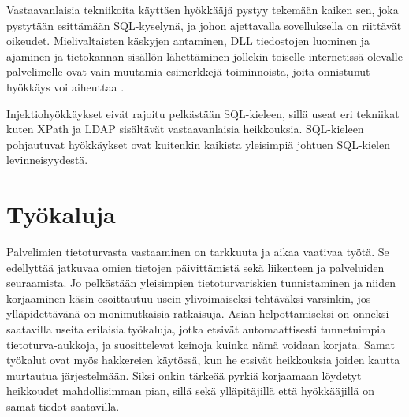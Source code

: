 Vastaavanlaisia tekniikoita käyttäen hyökkääjä pystyy tekemään kaiken sen, joka pystytään esittämään SQL-kyselynä, ja johon ajettavalla
sovelluksella on riittävät oikeudet. Mielivaltaisten käskyjen antaminen, DLL tiedostojen luominen ja ajaminen ja tietokannan
sisällön lähettäminen jollekin toiselle internetissä olevalle palvelimelle ovat vain muutamia esimerkkejä toiminnoista, joita
onnistunut hyökkäys voi aiheuttaa \cite{SQL SS}.

Injektiohyökkäykset eivät rajoitu pelkästään SQL-kieleen, sillä useat eri tekniikat kuten XPath ja LDAP sisältävät vastaavanlaisia heikkouksia.
SQL-kieleen pohjautuvat hyökkäykset ovat kuitenkin kaikista yleisimpiä johtuen SQL-kielen levinneisyydestä. 


\section{Työkaluja}
Palvelimien tietoturvasta vastaaminen on tarkkuuta ja aikaa vaativaa työtä. Se edellyttää jatkuvaa omien tietojen
päivittämistä sekä liikenteen ja palveluiden seuraamista. Jo pelkästään yleisimpien tietoturvariskien tunnistaminen ja
niiden korjaaminen käsin osoittautuu usein ylivoimaiseksi tehtäväksi varsinkin, jos ylläpidettävänä on monimutkaisia
ratkaisuja. Asian helpottamiseksi on onneksi saatavilla useita erilaisia työkaluja, jotka etsivät automaattisesti
tunnetuimpia tietoturva-aukkoja, ja suosittelevat keinoja kuinka nämä voidaan korjata. Samat työkalut ovat myös 
hakkereien käytössä, kun he etsivät heikkouksia joiden kautta murtautua järjestelmään. Siksi onkin tärkeää pyrkiä
korjaamaan löydetyt heikkoudet mahdollisimman pian, sillä sekä ylläpitäjillä että hyökkääjillä on samat tiedot saatavilla. 




